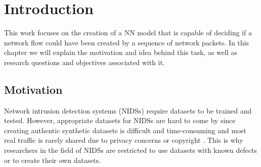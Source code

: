 \documentclass[
	ngerman,
	ruledheaders=section,%
	class=report,%
	thesis={type=bachelor},%
	accentcolor=9c,%
	custommargins=true,%
	marginpar=false,%
	parskip=half-,%
	fontsize=11pt,%
	twoside
]{tudapub}
\begin{document}

\chapter{Introduction}
\label{sec:intro}

This work focuses on the creation of a NN model that is capable of deciding if a network flow could have been created by a sequence of network packets.
In this chapter we will explain the motivation and idea behind this task, as well as research questions and objectives associated with it.

\section{Motivation}
\label{sec:motivation}

Network intrusion detection systems (NIDSs) require datasets to be trained and tested.
However, appropriate datasets for NIDSs are hard to come by
since creating authentic synthetic datasets is difficult and time-consuming
and most real traffic is rarely shared due to privacy concerns \cite{ringFlowbasedNetworkTraffic2019a} or copyright \cite{corderoID2TDIYDataset2015}.
This is why researchers in the field of NIDSs are restricted to use datasets with known defects or to create their own datasets.
\end{document}
